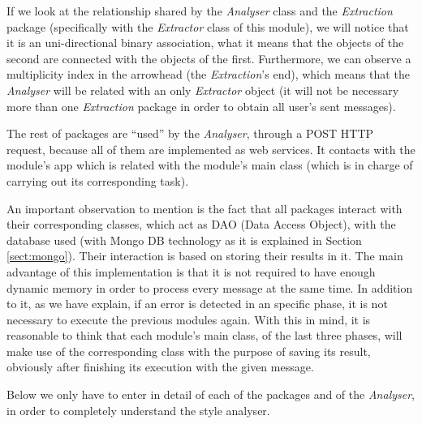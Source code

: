 If we look at the relationship shared by the \textit{Analyser} class and the \textit{Extraction} package (specifically with the \textit{Extractor} class of this module), we will notice that it is an uni-directional binary association, what it means that the objects of the second are connected with the objects of the first. Furthermore, we can observe a multiplicity index in the arrowhead (the \textit{Extraction}'s end), which means that the \textit{Analyser} will be related with an only \textit{Extractor} object (it will not be necessary more than one \textit{Extraction} package in order to obtain all user's sent messages).

The rest of packages are ``used'' by the \textit{Analyser}, through a POST HTTP request, because all of them are implemented as web services. It contacts with the module's app which is related with the module's main class (which is in charge of carrying out its corresponding task).

An important observation to mention is the fact that all packages interact with their corresponding classes, which act as DAO (Data Access Object), with the database used (with Mongo DB technology as it is explained in Section \ref{sect:mongo}). Their interaction is based on storing their results in it. The main advantage of this implementation is that it is not required to have enough dynamic memory in order to process every message at the same time. In addition to it, as we have explain, if an error is detected in an specific phase, it is not necessary to execute the previous modules again. With this in mind, it is reasonable to think that each module's main class, of the last three phases, will make use of the corresponding class with the purpose of saving its result, obviously after finishing its execution with the given message.

Below we only have to enter in detail of each of the packages and of the \textit{Analyser}, in order to completely understand the style analyser.